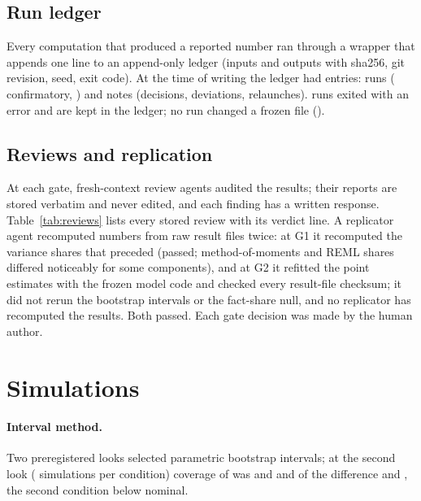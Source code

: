 \subsection{Run ledger}
Every computation that produced a reported number ran through a wrapper that appends one line to an append-only ledger (inputs and outputs with sha256, git revision, seed, exit code).
At the time of writing the ledger had \intLedgerEntries{} entries: \intLedgerRuns{} runs (\intLedgerRunsConf{} confirmatory, \intLedgerRunsExpl{} \expl) and \intLedgerNotes{} notes (decisions, deviations, relaunches).
\intLedgerRunsFailed{} runs exited with an error and are kept in the ledger; no run changed a frozen file (\intLedgerRunsFrozenViol).

\subsection{Reviews and replication}
At each gate, fresh-context review agents audited the results; their reports are stored verbatim and never edited, and each finding has a written response.
Table~\ref{tab:reviews} lists every stored review with its verdict line.
A replicator agent recomputed numbers from raw result files twice: at G1 it recomputed the \expl variance shares that preceded \STwo{} (passed; method-of-moments and REML shares differed noticeably for some components), and at G2 it refitted the \STwo point estimates with the frozen model code and checked every result-file checksum; it did not rerun the bootstrap intervals or the fact-share null, and no replicator has recomputed the \SOne results. Both passed.
Each gate decision was made by the human author.
\begin{table}[h]
\centering\small
\resizebox{\columnwidth}{!}{}
\caption{Gate reviews (\intNReviews{} stored reports). ``Per-claim'' reports give a verdict per item.}
\label{tab:reviews}
\end{table}

\FloatBarrier
\section{Simulations}
\label{app:sims}
\paragraph{Interval method.}
Two preregistered looks selected parametric bootstrap intervals; at the second look (\ptBsTwoEdN{} simulations per condition) coverage of \ICCone{} was \ptBsTwoEdCovIcc{} and \ptBsTwoFdCovIcc{} and of the difference \ptBsTwoEdCovDiff{} and \ptBsTwoFdCovDiff, the second condition below nominal.
